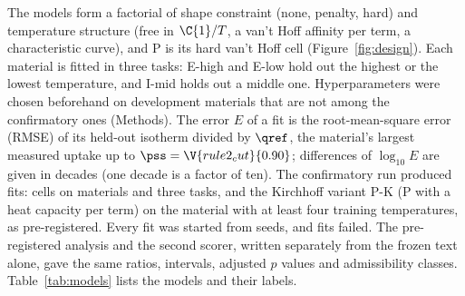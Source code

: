 \documentclass[journal=jcisd8,manuscript=article]{achemso}
\begin{document}
The models form a factorial of shape constraint (none, penalty, hard) and temperature structure (free in $\C{1}/T$,
a van't Hoff affinity per term, a characteristic curve), and P is its hard van't Hoff cell (Figure~\ref{fig:design}).
Each material is fitted in three tasks: E-high and E-low hold out the highest or the lowest temperature, and I-mid
holds out a middle one. Hyperparameters were chosen beforehand on  development materials
that are not among the  confirmatory ones (Methods). The error $E$ of a fit is the root-mean-square error (RMSE) of its held-out isotherm divided
by $\qref$, the material's largest measured uptake up to $\pss = \V{rule2_cut}{0.90}$; differences of $\log_{10} E$
are given in decades (one decade is a factor of ten). The confirmatory run produced  fits:  cells on
 materials and three tasks, and the Kirchhoff variant P-K (P with a heat capacity per term) on the  material with at
least four training temperatures, as pre-registered. Every fit was started from  seeds, and
 fits failed. The pre-registered analysis and the second scorer, written separately from the frozen text alone, gave the same
ratios, intervals, adjusted $p$ values and admissibility classes. Table~\ref{tab:models} lists the models and their
labels.
\end{document}
